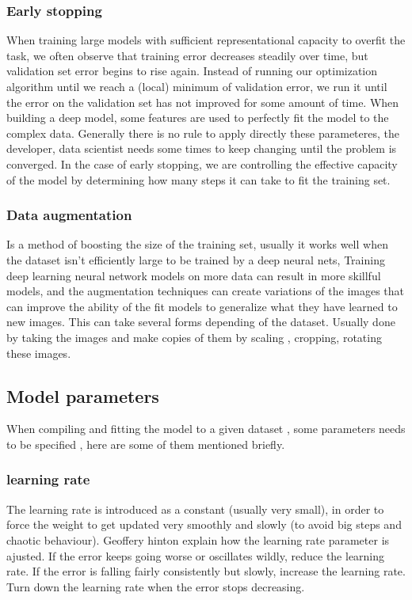 \subsubsection{Early stopping}
\label{Early stopping}
When training large models with sufficient representational capacity to overfit the
task, we often observe that training error decreases steadily over time, but validation
set error begins to rise again. Instead of running our optimization algorithm until we
reach a (local) minimum of validation error, we run it until the error on the validation
set has not improved for some amount of time.\cite{art20} When building a deep model, some
features are used to perfectly fit the model to the complex data. Generally there is no
rule to apply directly these parameteres, the developer, data scientist needs some times
to keep changing until the problem is converged. In the case of early stopping, we are
controlling the effective capacity of the model by determining how many steps it can take
to fit the training set.\cite{art25}
\subsubsection{Data augmentation}
Is a method of boosting the size of the training set, usually it works well when
the dataset isn’t efficiently large to be trained by a deep neural nets, Training deep
learning neural network models on more data can result in more skillful models, and
the augmentation techniques can create variations of the images that can improve the
ability of the fit models to generalize what they have learned to new images. This can
take several forms depending of the dataset. Usually done by taking the images and
make copies of them by scaling , cropping, rotating these images.\cite{art20}
\subsection{Model parameters}
When compiling and fitting the model to a given dataset , some parameters needs to
be specified , here are some of them mentioned briefly.
\subsubsection{learning rate}
The learning rate is introduced as a constant (usually very small), in order to force
the weight to get updated very smoothly and slowly (to avoid big steps and chaotic
behaviour).
Geoffery hinton explain how the learning rate parameter is ajusted.\cite{c1} If the error
keeps going worse or oscillates wildly, reduce the learning rate.
If the error is falling fairly consistently but slowly, increase the learning rate.
Turn down the learning rate when the error stops decreasing.
